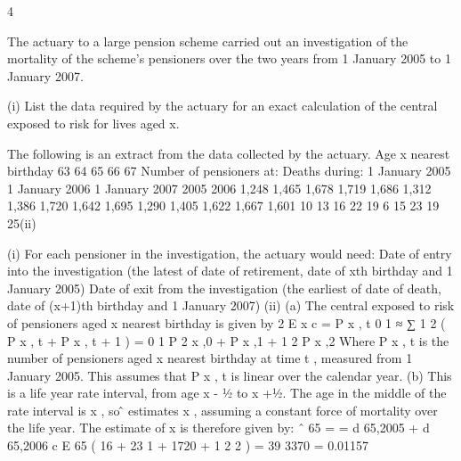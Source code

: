 \documentclass[a4paper,12pt]{article}
\begin{document}
4

The actuary to a large pension scheme carried out an investigation of the mortality of
the scheme’s pensioners over the two years from 1 January 2005 to 1 January 2007.

(i)
List the data required by the actuary for an exact calculation of the central
exposed to risk for lives aged x.

The following is an extract from the data collected by the actuary.
Age x
nearest
birthday
63
64
65
66
67
Number of pensioners at:
Deaths during:
1 January
2005 1 January
2006 1 January
2007 2005 2006
1,248
1,465
1,678
1,719
1,686 1,312
1,386
1,720
1,642
1,695 1,290
1,405
1,622
1,667
1,601 10
13
16
22
19 6
15
23
19
25(ii)

(i)
For each pensioner in the investigation, the actuary would need:
Date of entry into the investigation
(the latest of date of retirement, date of xth birthday and 1 January 2005)
Date of exit from the investigation
(the earliest of date of death, date of (x+1)th birthday and 1 January 2007)
(ii)
(a)
The central exposed to risk of pensioners aged x nearest birthday is
given by
2
E x c = \int P x , t
0
1
≈ ∑ 1 2 ( P x , t + P x , t + 1 ) =
0
1 P
2 x ,0
+ P x ,1 + 1 2 P x ,2
Where P x , t is the number of pensioners aged x nearest birthday at time
t , measured from 1 January 2005.
This assumes that P x , t is linear over the calendar year.
(b)
This is a life year rate interval, from age x - 1⁄2 to x +1⁄2. The age in the
middle of the rate interval is x , so \mû estimates \mu x , assuming a constant
force of mortality over the life year.
The estimate of \mu x is therefore given by:
\mu ˆ 65 =
=
d 65,2005 + d 65,2006
c
E 65
(
16 + 23
1  + 1720 + 1 
2
2
)
=
39
3370
= 0.01157
\end{document}
